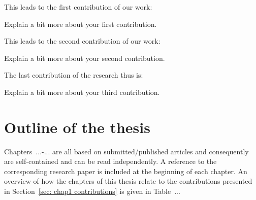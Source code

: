 
\lipsum[1-2] This leads to the first contribution of our work:

Explain a bit more about your first contribution.


\lipsum[4-5] This leads to the second contribution of our work:

Explain a bit more about your second contribution.


\lipsum[1-2] The last contribution of the research thus is:

Explain a bit more about your third contribution.


\section{Outline of the thesis}
\label{sec: chap1 outline}

\lipsum[10-12]

 Chapters~...-... are all based on submitted/published articles and consequently are self-contained and can be read independently. A reference to the corresponding research paper is included at the beginning of each chapter.
An overview of how the chapters of this thesis relate to the contributions presented in Section~\ref{sec: chap1 contributions} is given in Table~...

